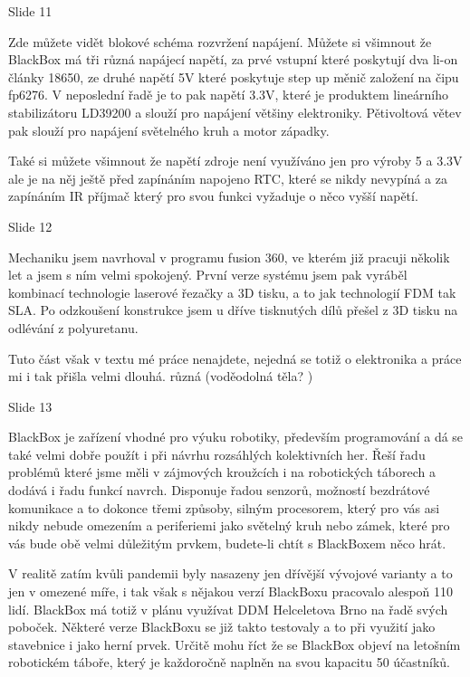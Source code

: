 
Slide 11

Zde můžete vidět blokové schéma rozvržení napájení.
Můžete si všimnout že BlackBox má tři různá napájecí napětí, za prvé vstupní které poskytují dva li-on články 18650, 
ze druhé napětí 5V které poskytuje step up měnič založení na čipu fp6276. V neposlední řadě je to pak napětí 3.3V,
které je produktem lineárního stabilizátoru LD39200 a slouží pro napájení většiny elektroniky.
Pětivoltová větev pak slouží pro napájení světelného kruh a motor západky.

Také si můžete všimnout že napětí zdroje není využíváno jen pro výroby 5 a 3.3V ale je na něj ještě před zapínáním 
napojeno RTC, které se nikdy nevypíná a za zapínáním IR příjmač který pro svou funkci vyžaduje o něco vyšší napětí.


Slide 12


Mechaniku jsem navrhoval v programu fusion 360, ve kterém již pracuji několik let a jsem s ním velmi spokojený.
První verze systému jsem pak vyráběl kombinací technologie laserové řezačky a 3D tisku, a to jak technologií FDM tak SLA.
Po odzkoušení konstrukce jsem u dříve tisknutých dílů přešel z 3D tisku na odlévání z polyuretanu. 

Tuto část však v textu mé práce nenajdete, nejedná se totiž o elektronika a práce mi i tak přišla velmi dlouhá.
různá (voděodolná těla? )


Slide 13

BlackBox je zařízení vhodné pro výuku robotiky, 
především programování a dá se také velmi dobře použít i při návrhu rozsáhlých 
kolektivních her. Řeší řadu problémů které jsme měli v zájmových kroužcích i na 
robotických táborech a dodává i řadu funkcí navrch.
Disponuje řadou senzorů, možností bezdrátové komunikace a to dokonce třemi způsoby, 
silným procesorem, který pro vás asi nikdy nebude omezením
a periferiemi jako světelný kruh nebo zámek, které pro vás bude obě velmi důležitým 
prvkem, budete-li chtít s BlackBoxem něco hrát.

V realitě zatím kvůli pandemii byly nasazeny jen dřívější vývojové varianty 
a to jen v omezené míře, i tak však s nějakou verzí BlackBoxu 
pracovalo alespoň 110 lidí.
BlackBox má totiž v plánu využívat DDM Helceletova Brno na řadě svých poboček.
Některé verze BlackBoxu se již takto testovaly a to při využití jako stavebnice 
i jako herní prvek. Určitě mohu říct že se BlackBox objeví 
na letošním robotickém táboře, který je každoročně naplněn na svou kapacitu 50 účastníků. 

